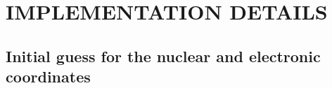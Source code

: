 \documentclass[%
 aip,
 jmp,%
 amsmath,amssymb,
reprint,%
]{revtex4-1}
\begin{document}

\section{\label{sec:level4} IMPLEMENTATION DETAILS}
\subsection{\label{ssec:level4A} Initial guess for the nuclear and electronic coordinates}
\end{document}
